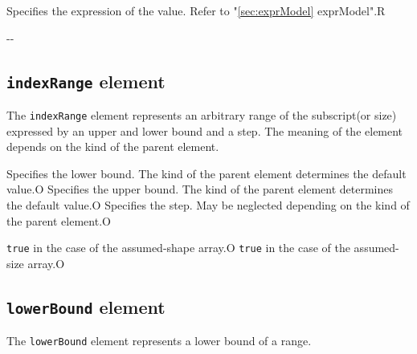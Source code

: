 \begin{XcodeMLChildElements}
{Specifies the expression of the value. Refer to "\ref{sec:exprModel} exprModel".}{R}
\end{XcodeMLChildElements}

\begin{XcodeMLAttributes}
\XcodeMLAttrDef{-}{-}
{-}{-}
\end{XcodeMLAttributes}


\subsection{ {\tt indexRange} element}

The {\tt indexRange} element represents an arbitrary range of the subscript(or size) expressed by an upper and lower bound and a step.
The meaning of the element depends on the kind of the parent element.


\begin{XcodeMLChildElements}
{Specifies the lower bound. The kind of the parent element determines the default value.}{O}
{Specifies the upper bound. The kind of the parent element determines the default value.}{O}
{Specifies the step. May be neglected depending on the kind of the parent element.}{O}
\end{XcodeMLChildElements}

\begin{XcodeMLAttributes}
{{\tt true} in the case of the assumed-shape array.}{O}
{{\tt true} in the case of the assumed-size array.}{O}
\end{XcodeMLAttributes}


\subsection{ {\tt lowerBound} element}

The {\tt lowerBound} element represents a lower bound of a range.


